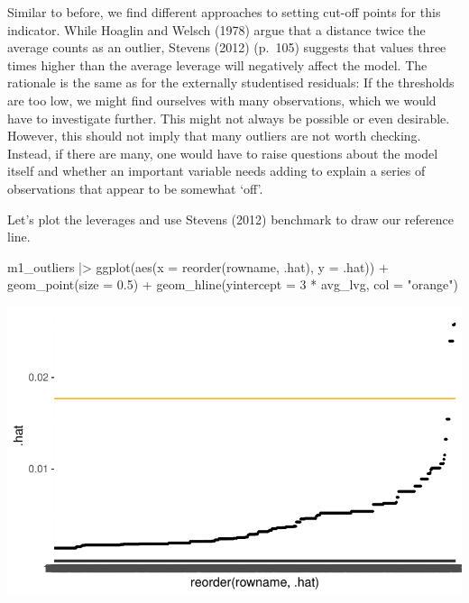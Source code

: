 \documentclass[
  letterpaper,
]{krantz}
\makeatletter
\newenvironment{Shaded}{\begin{snugshade}}{\end{snugshade}}
\newcommand{\AttributeTok}[1]{\textcolor[rgb]{0.40,0.45,0.13}{#1}}
\newcommand{\DecValTok}[1]{\textcolor[rgb]{0.68,0.00,0.00}{#1}}
\newcommand{\FloatTok}[1]{\textcolor[rgb]{0.68,0.00,0.00}{#1}}
\newcommand{\FunctionTok}[1]{\textcolor[rgb]{0.28,0.35,0.67}{#1}}
\newcommand{\NormalTok}[1]{\textcolor[rgb]{0.00,0.23,0.31}{#1}}
\newcommand{\SpecialCharTok}[1]{\textcolor[rgb]{0.37,0.37,0.37}{#1}}
\newcommand{\StringTok}[1]{\textcolor[rgb]{0.13,0.47,0.30}{#1}}
\newenvironment{kframe}{%
\medskip{}
\setlength{\fboxsep}{.8em}
 \def\at@end@of@kframe{}%
 \ifinner\ifhmode%
  \def\at@end@of@kframe{\end{minipage}}%
  \begin{minipage}{\columnwidth}%
 \fi\fi%
 \def\FrameCommand##1{\hskip\@totalleftmargin \hskip-\fboxsep
 \colorbox{shadecolor}{##1}\hskip-\fboxsep
     \hskip-\linewidth \hskip-\@totalleftmargin \hskip\columnwidth}%
 \MakeFramed {\advance\hsize-\width
   \@totalleftmargin\z@ \linewidth\hsize
   \@setminipage}}%
 {\par\unskip\endMakeFramed%
 \at@end@of@kframe}
\renewenvironment{Shaded}{\begin{kframe}}{\end{kframe}}
\makeatother
\begin{document}
Similar to before, we find different approaches to setting cut-off
points for this indicator. While Hoaglin and Welsch (1978) argue that a
distance twice the average counts as an outlier, Stevens (2012) (p.~105)
suggests that values three times higher than the average leverage will
negatively affect the model. The rationale is the same as for the
externally studentised residuals: If the thresholds are too low, we
might find ourselves with many observations, which we would have to
investigate further. This might not always be possible or even
desirable. However, this should not imply that many outliers are not
worth checking. Instead, if there are many, one would have to raise
questions about the model itself and whether an important variable needs
adding to explain a series of observations that appear to be somewhat
`off'.

Let's plot the leverages and use Stevens (2012) benchmark to draw our
reference line.

\begin{Shaded}
\begin{Highlighting}[]
\NormalTok{m1\_outliers }\SpecialCharTok{|\textgreater{}}
  \FunctionTok{ggplot}\NormalTok{(}\FunctionTok{aes}\NormalTok{(}\AttributeTok{x =} \FunctionTok{reorder}\NormalTok{(rowname, .hat),}
             \AttributeTok{y =}\NormalTok{ .hat)) }\SpecialCharTok{+}
  \FunctionTok{geom\_point}\NormalTok{(}\AttributeTok{size =} \FloatTok{0.5}\NormalTok{) }\SpecialCharTok{+}
  \FunctionTok{geom\_hline}\NormalTok{(}\AttributeTok{yintercept =} \DecValTok{3} \SpecialCharTok{*}\NormalTok{ avg\_lvg, }\AttributeTok{col =} \StringTok{"orange"}\NormalTok{)}
\end{Highlighting}
\end{Shaded}

\includegraphics{13_regressions_files/figure-pdf/avg-lvg-plot-1.pdf}
\end{document}

